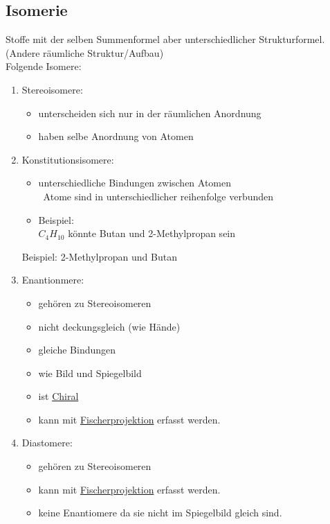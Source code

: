 \subsection{Isomerie}
Stoffe mit der selben Summenformel aber unterschiedlicher Strukturformel. \\
(Andere räumliche Struktur/Aufbau) \\
Folgende Isomere: 
\begin{enumerate}
    \item Stereoisomere:
        \begin{itemize}
            \item unterscheiden sich nur in der räumlichen Anordnung
            \item haben selbe Anordnung von Atomen
        \end{itemize}
    \item Konstitutionsisomere:
        \begin{itemize}
            \item unterschiedliche Bindungen zwischen Atomen \\
                \textrightarrow\ Atome sind in unterschiedlicher reihenfolge verbunden
            \item Beispiel: \\
                $C_4H_10$ könnte Butan und 2-Methylpropan sein
        \end{itemize}
        Beispiel: 2-Methylpropan und Butan
    \item Enantionmere:
        \begin{itemize}
            \item gehören zu Stereoisomeren
            \item nicht deckungsgleich (wie Hände)
            \item gleiche Bindungen
            \item wie Bild und Spiegelbild
            \item ist \hyperref[sec:chiral]{Chiral}
            \item kann mit \hyperref[sec:fischer]{Fischerprojektion} erfasst werden.
        \end{itemize}
    \item Diastomere:
        \begin{itemize}
            \item gehören zu Stereoisomeren
            \item kann mit \hyperref[sec:fischer]{Fischerprojektion} erfasst werden.
            \item keine Enantiomere da sie nicht im Spiegelbild gleich sind.
        \end{itemize}
\end{enumerate}

